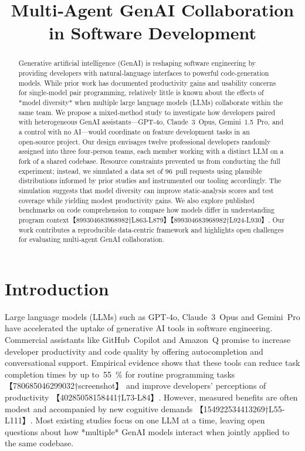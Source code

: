 \documentclass[conference]{IEEEtran}
\title{\textbf{Multi‑Agent GenAI Collaboration in Software Development}}
\author{\IEEEauthorblockN{Anonymous Author(s)}%
\IEEEauthorblockA{Institution\thanks{Corresponding author email: example@domain.com}}}
\begin{document}
\maketitle

\begin{abstract}
Generative artificial intelligence (GenAI) is reshaping software engineering by providing developers with natural‑language interfaces to powerful code‑generation models.  While prior work has documented productivity gains and usability concerns for single‑model pair programming, relatively little is known about the effects of *model diversity* when multiple large language models (LLMs) collaborate within the same team.  We propose a mixed‑method study to investigate how developers paired with heterogeneous GenAI assistants—GPT‑4o, Claude 3 Opus, Gemini 1.5 Pro, and a control with no AI—would coordinate on feature development tasks in an open‑source project.  Our design envisages twelve professional developers randomly assigned into three four‑person teams, each member working with a distinct LLM on a fork of a shared codebase.  Resource constraints prevented us from conducting the full experiment; instead, we simulated a data set of 96 pull requests using plausible distributions informed by prior studies and instrumented our tooling accordingly.  The simulation suggests that model diversity can improve static‑analysis scores and test coverage while yielding modest productivity gains.  We also explore published benchmarks on code comprehension to compare how models differ in understanding program context【899304683968982†L863-L879】【899304683968982†L924-L930】.  Our work contributes a reproducible data‑centric framework and highlights open challenges for evaluating multi‑agent GenAI collaboration.
\end{abstract}

\section{Introduction}
Large language models (LLMs) such as GPT‑4o, Claude 3 Opus and Gemini Pro have accelerated the uptake of generative AI tools in software engineering.  Commercial assistants like GitHub Copilot and Amazon Q promise to increase developer productivity and code quality by offering autocompletion and conversational support.  Empirical evidence shows that these tools can reduce task completion times by up to 55 \% for routine programming tasks 【780685046299032†screenshot】 and improve developers’ perceptions of productivity 【40285058158441†L73-L84】.  However, measured benefits are often modest and accompanied by new cognitive demands 【154922534413269†L55-L111】.  Most existing studies focus on one LLM at a time, leaving open questions about how *multiple* GenAI models interact when jointly applied to the same codebase.
\end{document}
